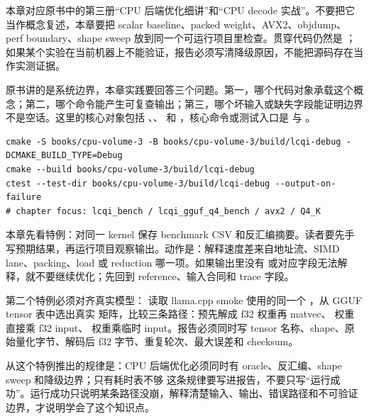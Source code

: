 
本章对应原书中的第三册“CPU 后端优化细讲”和“CPU decode 实战”。不要把它当作概念复述，本章要把 scalar baseline、packed weight、AVX2、objdump、perf boundary、shape sweep 放到同一个可运行项目里检查。贯穿代码仍然是 ；如果某个实验在当前机器上不能验证，报告必须写清降级原因，不能把源码存在当作实测证据。


原书讲的是系统边界，本章实践要回答三个问题。第一，哪个代码对象承载这个概念；第二，哪个命令能产生可复查输出；第三，哪个坏输入或缺失字段能证明边界不是空话。这里的核心对象包括 、、 和 ，核心命令或测试入口是  与 。

\begin{lstlisting}[numbers=none,caption={第 13 章实践：CPU 后端、微内核与性能证据 的最小命令入口}]
cmake -S books/cpu-volume-3 -B books/cpu-volume-3/build/lcqi-debug -DCMAKE_BUILD_TYPE=Debug
cmake --build books/cpu-volume-3/build/lcqi-debug
ctest --test-dir books/cpu-volume-3/build/lcqi-debug --output-on-failure
# chapter focus: lcqi_bench / lcqi_gguf_q4_bench / avx2 / Q4_K
\end{lstlisting}


本章先看特例：对同一 kernel 保存 benchmark CSV 和反汇编摘要。读者要先手写预期结果，再运行项目观察输出。动作是：解释速度差来自地址流、SIMD lane、packing、load 或 reduction 哪一项。如果输出里没有  或对应字段无法解释，就不要继续优化；先回到 reference、输入合同和 trace 字段。

第二个特例必须对齐真实模型： 读取 llama.cpp smoke 使用的同一个 ，从 GGUF tensor 表中选出真实  矩阵，比较三条路径：预先解成 f32 权重再 matvec、 权重直接乘 f32 input、 权重乘临时  input。报告必须同时写 tensor 名称、shape、原始量化字节、解码后 f32 字节、重复轮次、最大误差和 checksum。

从这个特例推出的规律是：CPU 后端优化必须同时有 oracle、反汇编、shape sweep 和降级边界；只有耗时表不够 这条规律要写进报告，不要只写“运行成功”。运行成功只说明某条路径没崩，解释清楚输入、输出、错误路径和不可验证边界，才说明学会了这个知识点。


